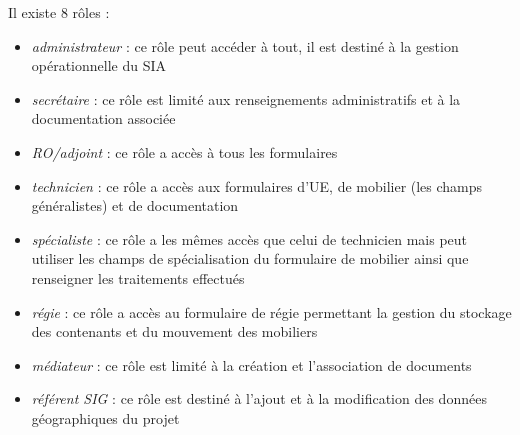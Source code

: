 \documentclass[letterpaper,10pt,french]{sphinxmanual}
\begin{document}
Il existe 8 rôles :
\begin{itemize}
\item {} 
\emph{administrateur} : ce rôle peut accéder à tout, il est destiné à la gestion opérationnelle du SIA

\item {} 
\emph{secrétaire} : ce rôle est limité aux renseignements administratifs et à la documentation associée

\item {} 
\emph{RO/adjoint} : ce rôle a accès à tous les formulaires

\item {} 
\emph{technicien} : ce rôle a accès aux formulaires d'UE, de mobilier (les champs généralistes) et de documentation

\item {} 
\emph{spécialiste} : ce rôle a les mêmes accès que celui de technicien mais peut utiliser les champs de spécialisation du formulaire de mobilier ainsi que renseigner les traitements effectués

\item {} 
\emph{régie} : ce rôle a accès au formulaire de régie permettant la gestion du stockage des contenants et du mouvement des mobiliers

\item {} 
\emph{médiateur} : ce rôle est limité à la création et l'association de documents

\item {} 
\emph{référent SIG} : ce rôle est destiné à l'ajout et à la modification des données géographiques du projet

\end{itemize}
\end{document}
